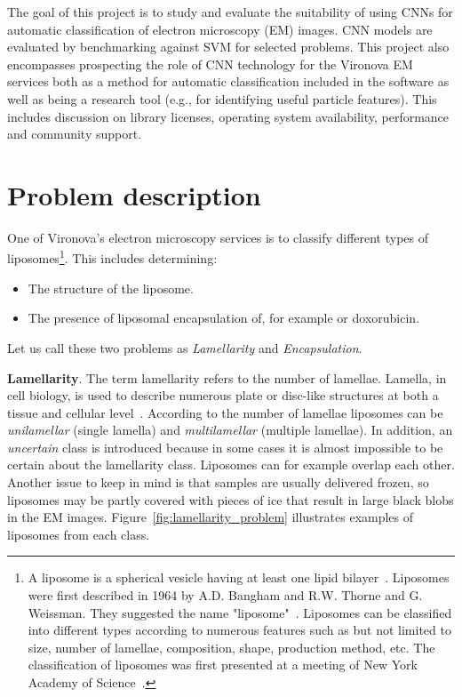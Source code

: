 \documentclass[a4paper, 11pt, table]{article}
\begin{document}
The goal of this project is to study and evaluate the suitability of using CNNs for automatic classification of electron microscopy (EM) images. CNN models are evaluated by benchmarking against SVM for selected problems. This project also encompasses prospecting the role of CNN technology for the Vironova EM services both as a method for automatic classification included in the software as well as being a research tool (e.g., for identifying useful particle features). This includes discussion on library licenses, operating system availability, performance and community support.

\section{Problem description}
\label{sec:problem_description}
One of Vironova's electron microscopy services is to classify different types of liposomes\footnote{A liposome is a spherical vesicle having at least one lipid bilayer~\cite{betageri1993liposome}. Liposomes were first described in 1964 by A.D. Bangham and R.W. Thorne and G. Weissman. They suggested the name "liposome"~\cite{betageri1993liposome}. Liposomes can be classified into different types according to numerous features such as but not limited to size, number of lamellae, composition, shape, production method, etc. The classification of liposomes was first presented at a meeting of New York Academy of Science~\cite{liposomes1978}.}. This includes determining:
\begin{itemize}
\item The structure of the liposome.
\item The presence of liposomal encapsulation of, for example or doxorubicin.
\end{itemize}

Let us call these two problems as \textit{Lamellarity} and \textit{Encapsulation}.\medskip

\textbf{Lamellarity}. The term lamellarity refers to the number of lamellae. Lamella, in cell biology, is used to describe numerous plate or disc-like structures at both a tissue and cellular level~\cite{cammack2006oxford}. According to the number of lamellae liposomes can be \textit{unilamellar} (single lamella) and \textit{multilamellar} (multiple lamellae). In addition, an \textit{uncertain} class is introduced because in some cases it is almost impossible to be certain about  the lamellarity class. Liposomes can for example overlap each other. Another issue to keep in mind is that samples are usually delivered frozen, so liposomes may be partly covered with pieces of ice that result in large black blobs in the EM images. Figure~\ref{fig:lamellarity_problem} illustrates examples of liposomes from each class.
\end{document}
